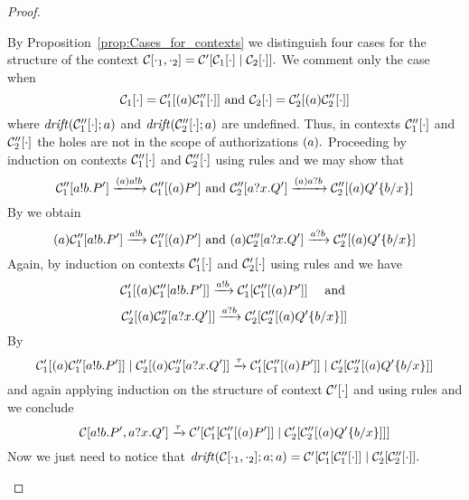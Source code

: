 \begin{proof}
\begin{itemize}
By Proposition~\ref{prop:Cases_for_contexts} we distinguish four cases for the structure of the context $\mathcal{C}[\cdot_1, \cdot_2]=\mathcal{C}'[\mathcal{C}_1[\cdot] \;|\; \mathcal{C}_2[\cdot]].$ We comment only the case when 
\[
\mathcal{C}_1[\cdot]=\mathcal{C}_1'[(a) \mathcal{C}_1''[\cdot]] \text{ and }
\mathcal{C}_2[\cdot]=\mathcal{C}_2'[(a) \mathcal{C}_2''[\cdot]]
\] 
where $\mathit {drift}(\mathcal{C}_1''[\cdot]; a)$ and $\mathit {drift}(\mathcal{C}_2''[\cdot]; a)$ are undefined. Thus, in contexts $\mathcal{C}_1''[\cdot]$ and $\mathcal{C}_2''[\cdot]$ the holes are not in the scope of authorizations $(a).$ 
Proceeding by induction on contexts $\mathcal{C}_1''[\cdot]$ and $\mathcal{C}_2''[\cdot]$ using rules  and  we may show that 
\[
\mathcal{C}_1''[a!b.P']\xrightarrow{{(a)}a!b}\mathcal{C}_1''[(a)P'] \text{ and }
\mathcal{C}_2''[a?x.Q']\xrightarrow{{(a)}a?b}\mathcal{C}_2''[(a)Q'\{b/x\}]
\]
By  we obtain
\[
(a)\mathcal{C}_1''[a!b.P']\xrightarrow{a!b}\mathcal{C}_1''[(a)P']  \text{ and } (a)\mathcal{C}_2''[a?x.Q']\xrightarrow{a?b}\mathcal{C}_2''[(a)Q'\{b/x\}]
\]
Again, by induction on contexts $\mathcal{C}_1'[\cdot]$ and $\mathcal{C}_2'[\cdot]$ using rules  and  we have
\[
\mathcal{C}_1'[(a)\mathcal{C}_1''[a!b.P']]\xrightarrow{a!b}\mathcal{C}_1'[\mathcal{C}_1''[(a)P']] \quad\text{ and }
\] 
\[
\mathcal{C}_2'[(a)\mathcal{C}_2''[a?x.Q']]\xrightarrow{a?b}\mathcal{C}_2'[\mathcal{C}_2''[(a)Q'\{b/x\}]]
\] 
By  
\[
\mathcal{C}_1'[(a)\mathcal{C}_1''[a!b.P']] \;|\; \mathcal{C}_2'[(a)\mathcal{C}_2''[a?x.Q']]\xrightarrow{\tau}\mathcal{C}_1'[\mathcal{C}_1''[(a)P']] \;|\;\mathcal{C}_2'[\mathcal{C}_2''[(a)Q'\{b/x\}]]
\]
and again applying induction on the structure of context $\mathcal{C}'[\cdot]$ and using rules  and  we conclude 
\[
\mathcal{C}[a!b.P', a?x.Q']\xrightarrow{\tau}
\mathcal{C}'[\mathcal{C}_1'[\mathcal{C}_1''[(a)P']] \;|\;\mathcal{C}_2'[\mathcal{C}_2''[(a)Q'\{b/x\}]]]
\]
Now we just need to notice that $\mathit {drift}(\mathcal{C}[\cdot_1, \cdot_2];a;a)=\mathcal{C}'[\mathcal{C}_1'[ \mathcal{C}_1''[\cdot]]\;|\;\mathcal{C}_2'[ \mathcal{C}_2''[\cdot]].$ 



\end{itemize}
\end{proof}
